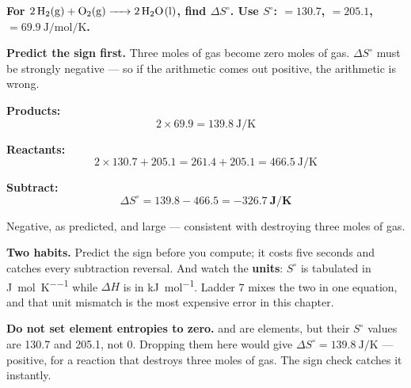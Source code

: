 \documentclass{apchem-worksheet}
\begin{document}
\begin{workedexample}
\textbf{For $\ce{2H2(g) + O2(g) -> 2H2O(l)}$, find
$\Delta S^{\circ}$. Use $S^{\circ}$:  $= 130.7$,
 $= 205.1$,  $=
\SI{69.9}{\joule\per\mole\per\kelvin}$.}

\textbf{Predict the sign first.} Three moles of gas become zero moles
of gas. $\Delta S^{\circ}$ must be strongly negative --- so if the
arithmetic comes out positive, the arithmetic is wrong.

\textbf{Products:}
\[ 2 \times 69.9 = \SI{139.8}{\joule\per\kelvin} \]

\textbf{Reactants:}
\[ 2 \times 130.7 + 205.1 = 261.4 + 205.1
   = \SI{466.5}{\joule\per\kelvin} \]

\textbf{Subtract:}
\[ \Delta S^{\circ} = 139.8 - 466.5
   = \mathbf{\SI{-326.7}{\joule\per\kelvin}} \]

Negative, as predicted, and large --- consistent with destroying three
moles of gas.

\textbf{Two habits.} Predict the sign before you compute; it costs five
seconds and catches every subtraction reversal. And watch the
\textbf{units}: $S^{\circ}$ is tabulated in
\si{\joule\per\mole\per\kelvin} while $\Delta H$ is in
\si{\kilo\joule\per\mole}. Ladder 7 mixes the two in one equation, and
that unit mismatch is the most expensive error in this chapter.

\textbf{Do not set element entropies to zero.}  and  are
elements, but their $S^{\circ}$ values are 130.7 and 205.1, not 0.
Dropping them here would give $\Delta S^{\circ} =
\SI{+139.8}{\joule\per\kelvin}$ --- positive, for a reaction that
destroys three moles of gas. The sign check catches it instantly.
\end{workedexample}
\end{document}
